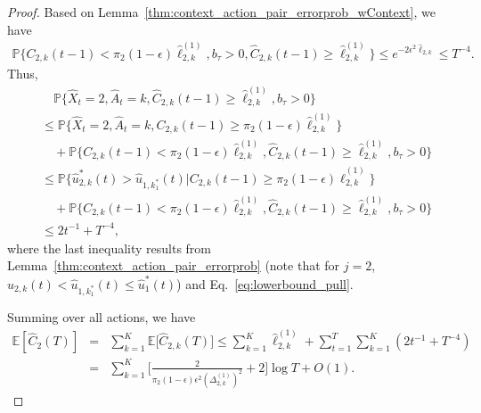 \begin{proof}
Based on Lemma~\ref{thm:context_action_pair_errorprob_wContext},  we have
\begin{align} \label{eq:lowerbound_pull}
\mathbb{P}\{{C}_{2,k}(t-1) < \pi_2(1 - \epsilon)\hat{\ell}_{2,k}^{(1)}, b_\tau > 0, \hat{C}_{2,k}(t-1) \geq \hat{\ell}_{2,k}^{(1)}\} \leq e^{-2\epsilon^2\hat{\ell}_{2,k}}\leq T^{-4}.
\end{align}
Thus,
\begin{align}
&\quad\mathbb{P}\{\hat{X}_t = 2, \hat{A}_t = k, \hat{C}_{2,k}(t-1) \geq \hat{\ell}_{2,k}^{(1)}, b_\tau > 0\} \nonumber \\
&\leq  \mathbb{P}\{\hat{X}_t = 2, \hat{A}_t = k, {C}_{2,k}(t-1) \geq \pi_2(1 - \epsilon)\hat{\ell}_{2,k}^{(1)}\} \nonumber\\
&\quad+ \mathbb{P}\{{C}_{2,k}(t-1) < \pi_2(1 - \epsilon)\hat{\ell}_{2,k}^{(1)}, \hat{C}_{2,k}(t-1) \geq \hat{\ell}_{2,k}^{(1)}, b_\tau > 0\} \nonumber \\
&\leq  \mathbb{P}\{\hat{u}_{2,k}^*(t) > \hat{u}_{1,k_1^*}(t)| {C}_{2,k}(t-1) \geq \pi_2(1 - \epsilon)\hat{\ell}_{2,k}^{(1)}\} \nonumber \\
&\quad+ \mathbb{P}\{{C}_{2,k}(t-1) < \pi_2(1 - \epsilon)\hat{\ell}_{2,k}^{(1)}, \hat{C}_{2,k}(t-1) \geq \hat{\ell}_{2,k}^{(1)}, b_\tau >0\} \nonumber \\
&\leq 2t^{-1} + T^{-4}, \nonumber
\end{align}
where the last inequality results from Lemma~\ref{thm:context_action_pair_errorprob} (note that for $j=2$, $\hat{u}_{2,k}(t) < \hat{u}_{1,k_1^*}(t) \leq \hat{u}_1^*(t)$) and  Eq.~\eqref{eq:lowerbound_pull}.

Summing over all actions,  we have
\begin{eqnarray}
\mathbb{E}[\hat{C}_2(T)]   &= & \sum_{k = 1}^K\mathbb{E}\big[\hat{C}_{2,k}(T)\big]
  \leq   \sum_{k = 1}^K\hat{\ell}_{2,k}^{(1)} + \sum_{t = 1}^T\sum_{k = 1}^K(2t^{-1} +T^{-4}) \nonumber \\
&=&\sum_{k = 1}^K \bigg[\frac{2}{\pi_2(1-\epsilon)\epsilon^2(\Delta_{2,k}^{(1)})^2} + 2\bigg]\log T + O(1). \nonumber
\end{eqnarray}


\end{proof}
